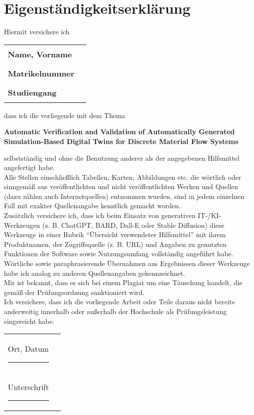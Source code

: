 \chapter*{Eigenständigkeitserklärung}
\thispagestyle{plain}

Hiermit versichere ich

\noindent
\begin{tabular}{ll}
  \textbf{Name, Vorname}  & \rule{8cm}{0.4pt} \\
  \textbf{Matrikelnummer} & \rule{8cm}{0.4pt} \\
  \textbf{Studiengang}    & \rule{8cm}{0.4pt}
\end{tabular}

\noindent
dass ich die vorliegende mit dem Thema

\begin{center}
  \large\bfseries
  Automatic Verification and Validation of Automatically Generated \\
  Simulation-Based Digital Twins for Discrete Material Flow Systems
\end{center}

\noindent
selbstständig und ohne die Benutzung anderer als der angegebenen Hilfsmittel angefertigt habe. \\
Alle Stellen \textemdash einschließlich Tabellen, Karten, Abbildungen etc. \textemdash die wörtlich oder sinngemäß aus veröffentlichten und nicht veröffentlichten Werken und Quellen (dazu zählen auch Internetquellen) entnommen wurden, sind in jedem einzelnen Fall mit exakter Quellenangabe kenntlich gemacht worden. \\

\noindent
Zusätzlich versichere ich, dass ich beim Einsatz von generativen IT-/KI-Werkzeugen (z. B. ChatGPT, BARD, Dall-E oder Stable Diffusion) diese Werkzeuge in einer Rubrik \enquote{Übersicht verwendeter Hilfsmittel} mit ihrem Produktnamen, der Zugriffsquelle (z. B. URL) und Angaben zu genutzten Funktionen der Software sowie Nutzungsumfang vollständig angeführt habe. Wörtliche sowie paraphrasierende Übernahmen aus Ergebnissen dieser Werkzeuge habe ich analog zu anderen Quellenangaben gekennzeichnet. \\

\noindent
Mir ist bekannt, dass es sich bei einem Plagiat um eine Täuschung handelt, die gemäß der Prüfungsordnung sanktioniert wird. \\

\noindent
Ich versichere, dass ich die vorliegende Arbeit oder Teile daraus nicht bereits anderweitig innerhalb oder außerhalb der Hochschule als Prüfungsleistung eingereicht habe. \\

\noindent
\begin{tabular}{ll}
  Ort, Datum \rule{7cm}{0.4pt} \\[0.5em]
  Unterschrift \rule{7cm}{0.4pt}
\end{tabular}